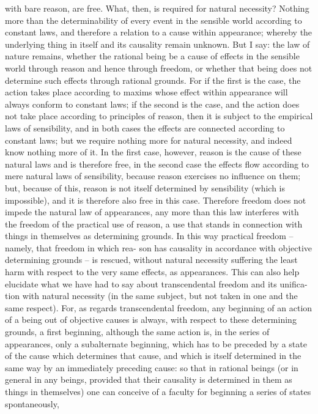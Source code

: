with bare reason, are free. What, then, is required for natural necessity?
Nothing more than the determinability of every event in the sensible
world according to constant laws, and therefore a relation to a cause
within appearance; whereby the underlying thing in itself and its causality
remain unknown. But I say: the law of nature remains, whether the rational
being be a cause of effects in the sensible world through reason and hence
through freedom, or whether that being does not determine such effects
through rational grounds. For if the ﬁrst is the case, the action takes place
according to maxims whose effect within appearance will always conform
to constant laws; if the second is the case, and the action does not take
place according to principles of reason, then it is subject to the empirical
laws of sensibility, and in both cases the effects are connected according
to constant laws; but we require nothing more for natural necessity, and
indeed know nothing more of it. In the ﬁrst case, however, reason is the
cause of these natural laws and is therefore free, in the second case the
effects ﬂow according to mere natural laws of sensibility, because reason
exercises no inﬂuence on them; but, because of this, reason is not itself
determined by sensibility (which is impossible), and it is therefore also
free in this case. Therefore freedom does not impede the natural law of
appearances, any more than this law interferes with the freedom of the
practical use of reason, a use that stands in connection with things in
themselves as determining grounds.
In this way practical freedom – namely, that freedom in which rea-
son has causality in accordance with objective determining grounds – is
rescued, without natural necessity suffering the least harm with respect
to the very same effects, as appearances. This can also help elucidate
what we have had to say about transcendental freedom and its uniﬁca-
tion with natural necessity (in the same subject, but not taken in one and
the same respect). For, as regards transcendental freedom, any beginning
of an action of a being out of objective causes is always, with respect to
these determining grounds, a ﬁrst beginning, although the same action
is, in the series of appearances, only a subalternate beginning, which has
to be preceded by a state of the cause which determines that cause, and
which is itself determined in the same way by an immediately preceding
cause: so that in rational beings (or in general in any beings, provided
that their causality is determined in them as things in themselves) one
can conceive of a faculty for beginning a series of states spontaneously,
